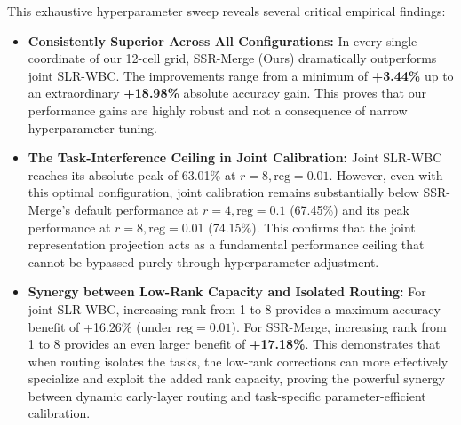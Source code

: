 \documentclass{article}
\theoremstyle{plain}
\theoremstyle{definition}
\theoremstyle{remark}
\begin{document}
This exhaustive hyperparameter sweep reveals several critical empirical findings:
\begin{itemize}
    \item \textbf{Consistently Superior Across All Configurations:} In every single coordinate of our 12-cell grid, SSR-Merge (Ours) dramatically outperforms joint SLR-WBC. The improvements range from a minimum of \textbf{+3.44\%} up to an extraordinary \textbf{+18.98\%} absolute accuracy gain. This proves that our performance gains are highly robust and not a consequence of narrow hyperparameter tuning.
    \item \textbf{The Task-Interference Ceiling in Joint Calibration:} Joint SLR-WBC reaches its absolute peak of 63.01\% at $r=8, \text{reg}=0.01$. However, even with this optimal configuration, joint calibration remains substantially below SSR-Merge's default performance at $r=4, \text{reg}=0.1$ (67.45\%) and its peak performance at $r=8, \text{reg}=0.01$ (74.15\%). This confirms that the joint representation projection acts as a fundamental performance ceiling that cannot be bypassed purely through hyperparameter adjustment.
    \item \textbf{Synergy between Low-Rank Capacity and Isolated Routing:} For joint SLR-WBC, increasing rank from 1 to 8 provides a maximum accuracy benefit of +16.26\% (under $\text{reg}=0.01$). For SSR-Merge, increasing rank from 1 to 8 provides an even larger benefit of \textbf{+17.18\%}. This demonstrates that when routing isolates the tasks, the low-rank corrections can more effectively specialize and exploit the added rank capacity, proving the powerful synergy between dynamic early-layer routing and task-specific parameter-efficient calibration.
\end{itemize}
\end{document}
